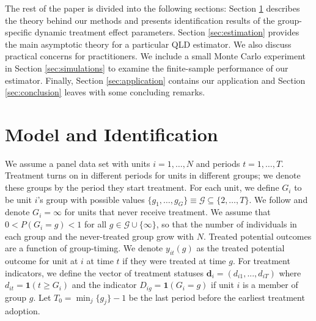 \documentclass[12pt]{article}
\begin{document}
The rest of the paper is divided into the following sections: Section \ref{sec:theory} describes the theory behind our methods and presents identification results of the group-specific dynamic treatment effect parameters. Section \ref{sec:estimation} provides the main asymptotic theory for a particular QLD estimator. We also discuss practical concerns for practitioners. We include a small Monte Carlo experiment in Section \ref{sec:simulations} to examine the finite-sample performance of our estimator. Finally, Section \ref{sec:application} contains our application and Section \ref{sec:conclusion} leaves with some concluding remarks. 


\section{Model and Identification} \label{sec:theory}

We assume a panel data set with units $i = 1,\dots, N$ and periods $t = 1, \dots, T$. Treatment turns on in different periods for units in different groups; we denote these groups by the period they start treatment. For each unit, we define $G_i$ to be unit $i$'s group with possible values $\{ g_1, \dots, g_G \} \equiv \mathcal{G} \subseteq \{ 2, \dots, T \}$. We follow \citet{Callaway_Santanna_2021} and denote $G_i = \infty$ for units that never receive treatment. We assume that $0 < P(G_i = g) < 1$ for all $g \in \mathcal{G} \cup \{ \infty \}$, so that the number of individuals in each group and the never-treated group grow with $N$. Treated potential outcomes are a function of group-timing. We denote $y_{it}(g)$ as the treated potential outcome for unit at $i$ at time $t$ if they were treated at time $g$. For treatment indicators, we define the vector of treatment statuses $\bm d_{i} = (d_{i1},...,d_{iT})$ where $d_{it} = \mathbf{1}(t \geq G_i)$ and the indicator $D_{ig} = \mathbf{1}(G_i = g)$ if unit $i$ is a member of group $g$. Let $T_0 = \min_j \{ g_j \} - 1$ be the last period before the earliest treatment adoption. 

\end{document}
